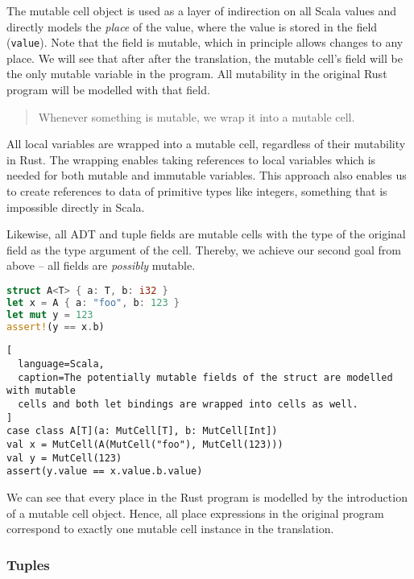 The mutable cell object is used as a layer of indirection on all Scala
values and directly models the \emph{place} of the value, where the
value is stored in the field (\passthrough{\lstinline!value!}). Note
that the field is mutable, which in principle allows changes to any
place. We will see that after after the translation, the mutable cell's
field will be the only mutable variable in the program. All mutability
in the original Rust program will be modelled with that field.

\begin{quote}
Whenever something is mutable, we wrap it into a mutable cell.
\end{quote}

All local variables are wrapped into a mutable cell, regardless of their
mutability in Rust. The wrapping enables taking references to local
variables which is needed for both mutable and immutable variables. This
approach also enables us to create references to data of primitive types
like integers, something that is impossible directly in Scala.

Likewise, all ADT and tuple fields are mutable cells with the type of
the original field as the type argument of the cell. Thereby, we achieve
our second goal from above -- all fields are \emph{possibly} mutable.

\begin{lstlisting}[language=Rust, caption=Some example Rust code.]
struct A<T> { a: T, b: i32 }
let x = A { a: "foo", b: 123 }
let mut y = 123
assert!(y == x.b)
\end{lstlisting}

\begin{lstlisting}[
  language=Scala,
  caption=The potentially mutable fields of the struct are modelled with mutable
  cells and both let bindings are wrapped into cells as well.
]
case class A[T](a: MutCell[T], b: MutCell[Int])
val x = MutCell(A(MutCell("foo"), MutCell(123)))
val y = MutCell(123)
assert(y.value == x.value.b.value)
\end{lstlisting}

We can see that every place in the Rust program is modelled by the
introduction of a mutable cell object. Hence, all place expressions in
the original program correspond to exactly one mutable cell instance in
the translation.

\subsubsection{Tuples}

